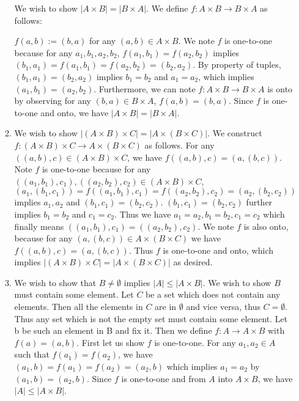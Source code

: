 \documentclass{article}
\begin{document}
\begin{enumerate}
\begin{enumerate}
			We wish to show $|A \times B| = |B \times A|$. We define $f: A \times B \xrightarrow{} B \times A$ as follows:
			
			$f(a,b) := (b,a)$ for any $(a,b) \in A \times B$. We note $f$ is one-to-one because for any $a_1, b_1, a_2, b_2$, $f(a_1, b_1) = f(a_2, b_2)$ implies $(b_1, a_1) = f(a_1, b_1) = f(a_2, b_2) = (b_2, a_2)$. By property of tuples, $(b_1, a_1) = (b_2, a_2)$ implies $b_1 = b_2$ and $a_1 = a_2$, which implies $(a_1, b_1) = (a_2, b_2)$. Furthermore, we can note $f: A \times B \xrightarrow{} B \times A$ is onto by observing for any $(b,a) \in B \times A$, $f(a,b) = (b,a)$. Since $f$ is one-to-one and onto, we have $|A \times B| = |B \times A|$.
			
			\item 
			\medskip
			
			We wish to show $|(A \times B) \times C| = |A \times (B \times C)|$. We construct $f: (A \times B) \times C \xrightarrow{} A \times (B \times C)$ as follows. For any $((a,b), c) \in (A \times B) \times C$, we have $f((a,b),c) = (a,(b,c))$. Note $f$ is one-to-one because for any $((a_1, b_1), c_1), ((a_2, b_2), c_2) \in (A \times B) \times C$, $(a_1, (b_1, c_1)) = f((a_1, b_1), c_1) = f((a_2, b_2), c_2) = (a_2, (b_2, c_2))$ implies $a_1, a_2$ and $(b_1, c_1) = (b_2, c_2)$. $(b_1, c_1) = (b_2, c_2)$ further implies $b_1 = b_2$ and $c_1 = c_2$. Thus we have $a_1 = a_2, b_1 = b_2, c_1 = c_2$ which finally means $((a_1, b_1), c_1) = ((a_2, b_2), c_2)$. We note $f$ is also onto, because for any $(a,(b,c)) \in A \times (B \times C)$ we have $f((a,b),c) = (a,(b,c))$. Thus $f$ is one-to-one and onto, which implies $|(A \times B) \times C| = |A \times (B \times C)|$ as desired.
			
			\item 
			\medskip
			
			We wish to show that $B \neq \emptyset$ implies $|A| \leq |A \times B|$. We wish to show $B$ must contain some element. Let $C$ be a set which does not contain any elements. Then all the elements in $C$ are in $\emptyset$ and vice versa, thus $C = \emptyset$. Thus any set which is not the empty set must contain some element. Let b be such an element in B and fix it. Then we define $f: A \xrightarrow{} A \times B$ with $f(a) = (a,b)$. First let us show $f$ is one-to-one. For any $a_1, a_2 \in A$ such that $f(a_1) = f(a_2)$, we have $(a_1, b) = f(a_1) = f(a_2) = (a_2, b)$ which implies $a_1 = a_2$ by $(a_1, b) = (a_2, b)$. Since $f$ is one-to-one and from $A$ into $A \times B$, we have $|A| \leq |A \times B|$.
			

\end{enumerate}
\end{enumerate}
\end{document}

